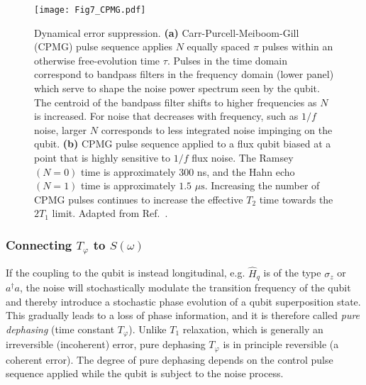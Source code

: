 \documentclass[aip,apr,twocolumn,showpacs,superscriptaddress,groupedaddress,nofootinbib,reprint]{revtex4-1}  %
\begin{document}
\begin{figure}[!t]
\centering
    \texttt{[image: Fig7\_CPMG.pdf]}
    \caption{Dynamical error suppression.
    \textbf{(a)} Carr-Purcell-Meiboom-Gill (CPMG) pulse sequence applies $N$ equally spaced $\pi$ pulses within an otherwise free-evolution time $\tau$. Pulses in the time domain correspond to bandpass filters in the frequency domain (lower panel) which serve to shape the noise power spectrum seen by the qubit. The centroid of the bandpass filter shifts to higher frequencies as $N$ is increased. For noise that decreases with frequency, such as $1/f$ noise, larger $N$ corresponds to less integrated noise impinging on the qubit.
    \textbf{(b)} CPMG pulse sequence applied to a flux qubit biased at a point that is highly sensitive to $1/f$ flux noise. The Ramsey $(N=0)$ time is approximately 300 ns, and the Hahn echo $(N=1)$ time is approximately $1.5$ $\mu \mathrm{s}$. Increasing the number of CPMG pulses continues to increase the effective $T_2$ time towards the $2T_1$ limit. Adapted from Ref.~.
    }
\label{fig:CPMG}
\end{figure}

\subsubsection{\label{sec:Tphi-S}Connecting $T_{\varphi}$ to $S(\omega)$}

If the coupling to the qubit is instead longitudinal, e.g. $\hat{H}_q$ is of the type $\sigma_z$ or $a^{\dagger}a$, the noise will stochastically modulate the transition frequency of the qubit and thereby  introduce a stochastic phase evolution of a qubit superposition state. This gradually leads to a loss of phase information, and it is therefore called \textit{pure dephasing} (time constant $T_{\varphi}$). Unlike $T_1$ relaxation, which is generally an irreversible (incoherent) error, pure dephasing $T_{\varphi}$ is in principle reversible (a coherent error). The degree of pure dephasing depends on the control pulse sequence applied while the qubit is subject to the noise process.
\end{document}
